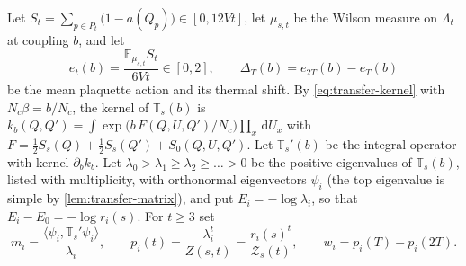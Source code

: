 \documentclass[11pt,a4paper]{amsart}
\theoremstyle{definition}
\theoremstyle{remark}
\numberwithin{equation}{section}
\newcommand{\ip}[2]{\langle #1,#2\rangle}  %
\newcommand{\dd}{\,\mathrm{d}}             %
\newcommand{\TT}{\mathbb{T}}               %
\newcommand{\Zpart}[2]{Z(#1,#2)}           %
\newcommand{\Zc}{\mathcal{Z}}              %
\newcommand{\Zs}[2]{\Zc_{#1}(#2)}          %
\begin{document}
Let $S_t=\sum_{p\in P_t}\bigl(1-a(Q_p)\bigr)\in[0,12Vt]$, let $\mu_{s,t}$ be the Wilson measure on $\Lambda_t$ at coupling $b$, and let
\[
e_t(b)=\frac{\mathbb{E}_{\mu_{s,t}}S_t}{6Vt}\in[0,2],\qquad \Delta_T(b)=e_{2T}(b)-e_T(b)
\]
be the mean plaquette action and its thermal shift. By \eqref{eq:transfer-kernel} with $N_c\beta=b/N_c$, the kernel of $\TT_s(b)$ is $k_b(Q,Q')=\int\exp\bigl(b\,F(Q,U,Q')/N_c\bigr)\prod_x\dd U_x$ with $F=\frac12S_s(Q)+\frac12S_s(Q')+S_0(Q,U,Q')$. Let $\TT_s'(b)$ be the integral operator with kernel $\partial_bk_b$. Let $\lambda_0>\lambda_1\ge\lambda_2\ge\dots>0$ be the positive eigenvalues of $\TT_s(b)$, listed with multiplicity, with orthonormal eigenvectors $\psi_i$ (the top eigenvalue is simple by \cref{lem:transfer-matrix}), and put $E_i=-\log\lambda_i$, so that $E_i-E_0=-\log r_i(s)$. For $t\ge3$ set
\begin{equation}\label{eq:response-weights}
m_i=\frac{\ip{\psi_i}{\TT_s'\psi_i}}{\lambda_i},\qquad p_i(t)=\frac{\lambda_i^t}{\Zpart{s}{t}}=\frac{r_i(s)^t}{\Zs{s}{t}},\qquad w_i=p_i(T)-p_i(2T).
\end{equation}
\end{document}
